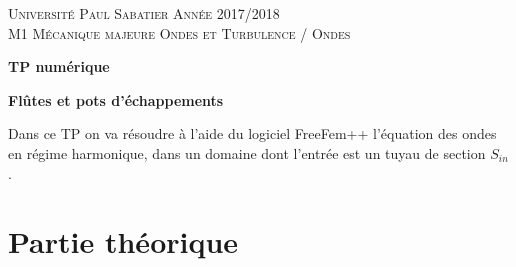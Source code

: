 \documentclass[11pt,a4paper]{article}
\begin{document}

\noindent
\textsc{Universit\'e Paul Sabatier \hfill Ann\'ee 2017/2018} \\
\textsc{M1 Mécanique \hfill majeure Ondes et Turbulence / Ondes}


\vspace{.3cm}
\begin{center}
{\Huge \bf TP numérique} 

\vspace{.3cm}

{\Huge \bf Flûtes et pots d'échappements}
\end{center}

\vspace{.6cm}
\large


Dans ce TP on va résoudre à l'aide du logiciel FreeFem++ l'équation des ondes en régime harmonique, dans un domaine dont l'entrée est un tuyau de section 
$S_{in}$.

\vspace{.4cm}

\section{Partie théorique}

 
 
 
 
 
 
 
 
\end{document}
